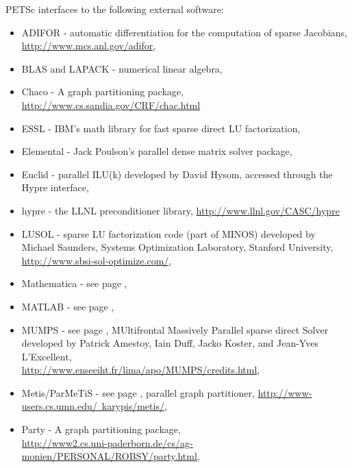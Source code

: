 \vspace{.3in}
\noindent
PETSc interfaces to the following external software:
\begin{itemize}
  \item ADIFOR -  automatic differentiation for the computation of sparse Jacobians,\\
                     \href{http://www.mcs.anl.gov/adifor}{http://www.mcs.anl.gov/adifor},
  \item BLAS and LAPACK - numerical linear algebra,
  \item Chaco -     A graph partitioning package, \href{ http://www.cs.sandia.gov/CRF/chac.html}{ http://www.cs.sandia.gov/CRF/chac.html}
  \item ESSL -         IBM's math library for fast sparse direct LU factorization,
  \item Elemental -  Jack Poulson's parallel dense matrix solver package,
  \item Euclid  -   parallel ILU(k) developed by David Hysom, accessed through the Hypre interface,
  \item hypre -    the LLNL preconditioner library, \href{http://www.llnl.gov/CASC/hypre}{http://www.llnl.gov/CASC/hypre}
  \item LUSOL -       sparse LU factorization code (part of MINOS) developed by Michael Saunders,
                      Systems Optimization Laboratory, Stanford University,
                     \href{http://www.sbsi-sol-optimize.com/}{http://www.sbsi-sol-optimize.com/},
  \item Mathematica -  see page \pageref{ch_mathematica},
  \item MATLAB -      see page \pageref{ch_matlab},
  \item MUMPS -      see page \pageref{sec_externalsol}, MUltifrontal Massively Parallel sparse direct Solver developed by Patrick Amestoy,
                     Iain Duff, Jacko Koster, and Jean-Yves L'Excellent, \\
                     \href{http://www.enseeiht.fr/lima/apo/MUMPS/credits.html}{http://www.enseeiht.fr/lima/apo/MUMPS/credits.html},
  \item Metis/ParMeTiS - see page \pageref{sec_partitioning}, parallel graph partitioner,
                     \href{http://www-users.cs.umn.edu/~karypis/metis/}{http://www-users.cs.umn.edu/~karypis/metis/},
  \item Party -     A graph partitioning package, \\ 
               \href{http://www2.cs.uni-paderborn.de/cs/ag-monien/PERSONAL/ROBSY/party.html}{http://www2.cs.uni-paderborn.de/cs/ag-monien/PERSONAL/ROBSY/party.html},

\end{itemize}
